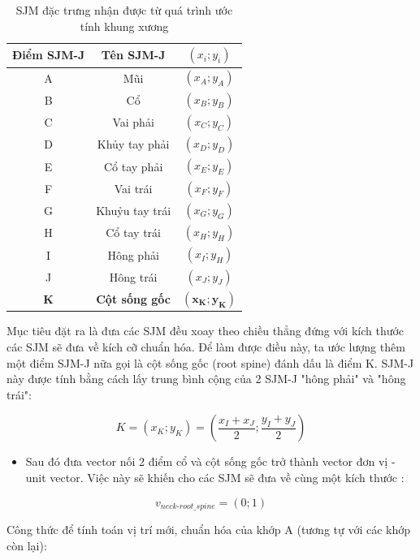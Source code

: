 \begin{table}[htp]
\centering
\caption{SJM đặc trưng nhận được từ quá trình ước tính khung xương}
\begin{tabular}{|c|c|c|}
\hline 
 Điểm SJM-J & Tên SJM-J & $(x_i; y_i) $\\ 
\hline 
A & Mũi  & $(x_A; y_A)$ \\
\hline 
B & Cổ & $(x_B; y_B)$ \\ 
\hline 
C & Vai phải  & $(x_C; y_C)$ \\ 
\hline 
D & Khủy tay phải & $(x_D; y_D)$ \\ 
\hline 
E & Cổ tay phải & $(x_E; y_E)$ \\ 
\hline
F & Vai trái & $(x_F; y_F)$ \\ 
\hline
G & Khuỷu tay trái & $(x_G; y_G)$ \\ 
\hline
H & Cổ tay trái & $(x_H; y_H)$ \\ 
\hline
I &  Hông phải & $(x_I; y_H)$ \\
\hline
J & Hông trái & $(x_J; y_J)$ \\ 
\hline
\textbf{K} & \textbf{Cột sống gốc} & $\mathbf{(x_K; y_K)}$ \\ 
\hline
\end{tabular} 
\label{BangSJM}
\end{table}

Mục tiêu đặt ra là đưa các SJM đều xoay theo chiều thẳng đứng với kích thước các SJM sẽ đưa về kích cỡ chuẩn hóa. Để làm được điều này, ta ước lượng thêm một điểm SJM-J nữa gọi là cột sống gốc (root spine) đánh dấu là điểm K. SJM-J này được tính bằng cách lấy trung bình cộng của 2 SJM-J "hông phải" và "hông trái":

\begin{equation}
K = (x_K; y_K) = (\frac{x_I+x_J}{2};\frac{y_I+y_J}{2})
\end{equation}

\begin{itemize}
\item Sau đó đưa vector nối 2 điểm cổ và cột sống gốc trở thành vector đơn vị - unit vector. Việc này sẽ khiến cho các SJM sẽ đưa về cùng một kích thước :
\end{itemize}

\begin{equation}
v_\textit{neck-root\_spine} = (0;1)
\end{equation}

Công thức để tính toán vị trí mới, chuẩn hóa của khớp A (tương tự với các khớp còn lại):

